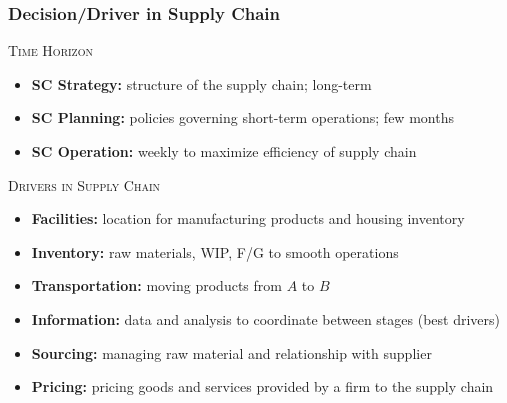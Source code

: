 \documentclass[10pt,handout,notes=show]{beamer}
\begin{document}
\begin{frame}
  \frametitle{Decision/Driver in Supply Chain}

  \textsc{Time Horizon}
  \begin{itemize}
    \item \textbf{SC Strategy:} structure of the supply chain; \alert{long-term}
    \item \textbf{SC Planning:} policies governing short-term operations; \alert{few months}
    \item \textbf{SC Operation:} \alert{weekly} to maximize efficiency of supply chain
  \end{itemize}

  \NextLine
  \textsc{Drivers in Supply Chain}
  \begin{itemize}
    \item \textbf{Facilities:} \alert{location} for manufacturing products and housing inventory
    \item \textbf{Inventory:} raw materials, WIP, F/G to \alert{smooth operations}
    \item \textbf{Transportation:} \alert{moving} products from $A$ to $B$
    \item \textbf{Information:} data and analysis to \alert{coordinate} between stages (best drivers)
    \item \textbf{Sourcing:} managing raw material and relationship with supplier
    \item \textbf{Pricing:} pricing goods and services provided by a firm to the supply chain
  \end{itemize}


\end{frame}
\end{document}
